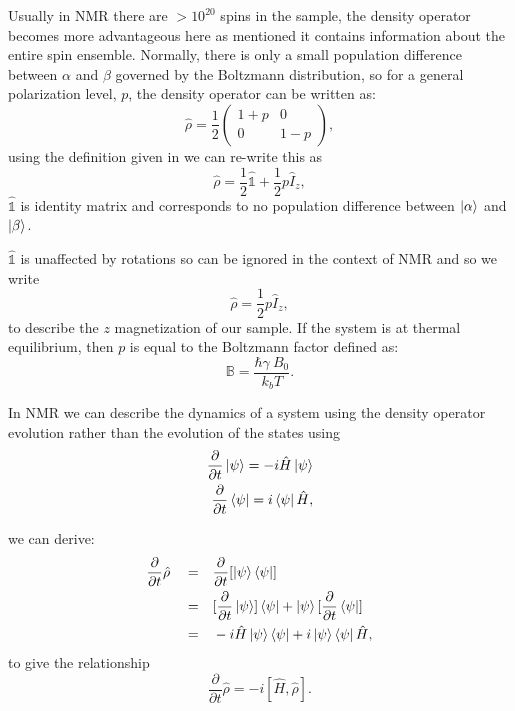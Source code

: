 Usually in NMR there are $>10^{20}$ spins in the sample, the density operator becomes more advantageous here
as mentioned it contains information about the entire spin ensemble. Normally, there is only a small population difference between $\alpha$ and $\beta$
governed by the Boltzmann distribution,
so for a general polarization level, $p$, the density operator can be written as:
\begin{equation}
  \hat\rho = \frac{1}{2}\begin{pmatrix}
    1 + p & 0\\
    0 & 1 - p
\end{pmatrix},
\end{equation}
using the definition given in  we can re-write this as
\begin{equation}
  \hat\rho = \frac{1}{2}\hat{\mathbb{1}} + \frac{1}{2}p\hat{I}_z,
\end{equation}
$\hat{\mathbb{1}}$ is identity matrix and corresponds to no population difference between $\ket{\alpha}$ and $\ket{\beta}$.

$\hat{\mathbb{1}}$ is unaffected by rotations so can be ignored in the context of NMR
and so we write
\begin{equation}
  \hat{\rho} = \frac{1}{2}p\hat{I}_z,
\end{equation}
to describe the $z$ magnetization of our sample. If the system is at thermal equilibrium,
then $p$ is equal to the Boltzmann factor defined as:
\begin{equation}
  \mathbb{B} = \frac{\hbar\gamma~B_0}{k_bT}.
\end{equation}


In NMR we can  describe the dynamics of a system using the density operator evolution rather than the evolution of the states using
\begin{align}
  \frac{\partial}{\partial{t}}\ket{\psi} = -i\hat{H}\ket{\psi}\\
  \frac{\partial}{\partial{t}}\bra{\psi} = i\bra{\psi}\hat{H},
\end{align}

we can derive\citep{Neumann2018}:
\begin{align}
  \frac{\partial}{\partial{t}}\hat\rho\quad=&\quad \frac{\partial}{\partial{t}}[\ket{\psi}\bra{\psi}]\\
  =&\quad[\frac{\partial}{\partial{t}}\ket{\psi}]\bra{\psi} + \ket{\psi}[\frac{\partial}{\partial{t}}\bra{\psi}]\\
  =&\quad-i\hat{H}\ket{\psi}\bra{\psi} + i\ket{\psi}\bra{\psi}\hat{H},
\end{align}
to give the relationship
\begin{equation}
  \frac{\partial}{\partial{t}}\hat\rho = -i[\hat{H},\hat\rho].
\end{equation}


